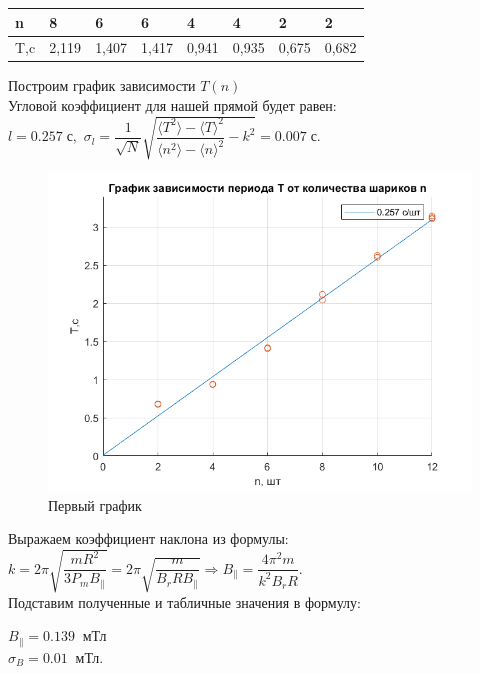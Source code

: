 \documentclass[a4paper,12pt]{article}
\begin{document}
\begin{enumerate}
\begin{table}[h!]
\begin{tabular}{|l|l|l|l|l|l|l|l|}
n   & 8     & 6     & 6     & 4     & 4     & 2     & 2     \\ \hline
T,c & 2,119 & 1,407 & 1,417 & 0,941 & 0,935 & 0,675 & 0,682 \\ \hline
\end{tabular}
\end{table}
Построим график зависимости $T(n)$ \\
Угловой коэффициент для нашей прямой будет равен:
\\
$
l = 0.257 \; \text{с},
$
$
\sigma_{l} = \dfrac{1}{\sqrt{N}}\sqrt{\dfrac{\langle T^2 \rangle - \langle T \rangle ^ 2}{\langle n^2 \rangle - \langle n \rangle ^ 2} - k^2} = 0.007 \; \text{с}.
$

\begin{figure}[h!]
\begin{center}
\includegraphics[scale=0.6]{plot1.png} 
\caption{Первый график}
\label{plot1}
\end{center}
\end{figure}

Выражаем коэффициент наклона из формулы:
$ k = 2 \pi \sqrt{\dfrac{m R^2}{3 P_m B_\parallel}} = 2\pi \sqrt{\dfrac{m}{B_r R B_\parallel}} \Rightarrow B_\parallel = \dfrac{4 \pi^2 m}{k^2 B_r R}.
$\\
Подставим полученные и табличные значения в формулу:

$ B_\parallel = 0.139 \;\; \text{мТл}$
\\
$\sigma_B  = 0.01 \;\;\text{мТл}.
$


\end{enumerate}
\end{document}
